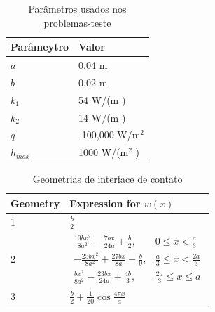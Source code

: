 \documentclass{beamer}
\begin{document}
\begin{frame}
	\begin{table}[H]
		\centering
		\caption{Parâmetros usados nos problemas-teste}
		\begin{tabular}{|l|l|}
			\hline
			\textbf{Parâmeytro} & \textbf{Valor}  \\ \hline
			$a$       & 0.04 m   \\ \hline
			$b$       & 0.02 m     \\ \hline
			$k_1$     & 54 W/(m \celsius)  \\ \hline
			$k_2$     & 14 W/(m \celsius) \\ \hline
			$q$       & -100,000 W/$\text{m}^2$ \\ \hline
			$h_{max}$       & 1000 W/($\text{m}^2$ \celsius) \\ \hline
		\end{tabular}		
		\label{tabela_params}
	\end{table}
\end{frame}


\begin{frame}
	\begin{table}[H]
		\centering
		\caption{Geometrias de interface de contato}
		\begin{tabular}{|l|l|}
			\hline 
			\textbf{Geometry} & \textbf{Expression for} $w(x)$    \\ \hline
			1       & $\frac{b}{2}$   \\ \hline
			2       & $\begin{array}{ll}
			\frac{19bx^2}{8a^2}-\frac{7bx}{24a}+\frac{b}{2}, &  0 \le x < \frac{a}{3} \\
			-\frac{25bx^2}{8a^2}+\frac{27bx}{8a}-\frac{b}{9}, &  \frac{a}{3} \le x < \frac{2a}{3} \\ 
			\frac{bx^2}{8a^2}-\frac{23bx}{24a}+\frac{4b}{3}, &  \frac{2a}{3} \le x \le a
			\end{array}$     \\ \hline
			3       & $ \frac{b}{2} + \frac{1}{20} \cos\frac{4 \pi  x}{a}$ \\ \hline
		\end{tabular}			
		\label{tabela_interfaces}
	\end{table}
\end{frame}
\end{document}
